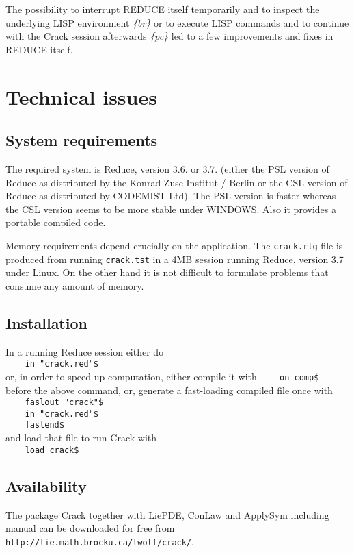 \documentclass[12pt]{article}
\begin{document}
  The possibility to interrupt REDUCE itself temporarily and to
  inspect the underlying LISP environment {\em \{br\} } 
  or to execute LISP commands and to continue with the {\sc Crack}
  session afterwards {\em \{pc\} } 
  led to a few improvements and fixes in REDUCE itself.

\section{Technical issues}
\subsection{System requirements} 
The required system is {\sc Reduce}, version
3.6. or 3.7. (either the PSL version of {\sc Reduce} as distributed by
the Konrad Zuse Institut / Berlin or the CSL version of {\sc Reduce}
 as distributed by CODEMIST Ltd). The PSL version is faster whereas
the CSL version seems to be more stable under WINDOWS. Also it
provides a portable compiled code.

Memory requirements depend crucially on the
application. The {\tt crack.rlg} file is produced from running 
{\tt crack.tst} in a 4MB session running {\sc Reduce}, version 3.7 under
{\sc Linux}. On the other hand it is not difficult to formulate problems that 
consume any amount of memory.

\subsection{Installation}
In a running {\sc Reduce} session either do \\
\verb+    in "crack.red"$ + \\
or, in order to speed up computation, either compile it with 
\verb+    on comp$ + \\
before the above command, or, generate a fast-loading compiled 
file once with \\
\verb+    faslout "crack"$ + \\
\verb+    in "crack.red"$ + \\
\verb+    faslend$ + \\
and load that file to run {\sc Crack} with \\
\verb+    load crack$ + 

\subsection{Availability}
The package {\sc Crack} together with {\sc LiePDE, ConLaw} and {\sc ApplySym}
including manual can be downloaded for free from \newline
\verb+http://lie.math.brocku.ca/twolf/crack/+. 
\end{document}

